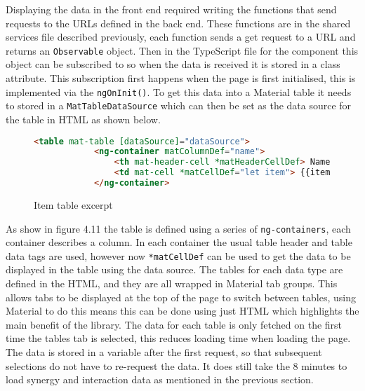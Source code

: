 Displaying the data in the front end required writing the functions that send requests to the URLs defined in the back end. 
These functions are in the shared services file described previously, each function sends a get request to a URL and returns an \verb|Observable| 
object. Then in the TypeScript file for the component this object can be subscribed to so when the data is received it is stored in a class attribute. 
This subscription first happens when the page is first initialised, this is implemented via the \verb|ngOnInit()|. To get this data into a Material table it needs to 
stored in a \verb|MatTableDataSource| which can then be set as the data source for the table in HTML as shown below. 
\begin{figure}[!htbp]
    \begin{lstlisting}[language=HTML]
        <table mat-table [dataSource]="dataSource">
            <ng-container matColumnDef="name">
                <th mat-header-cell *matHeaderCellDef> Name </th>
                <td mat-cell *matCellDef="let item"> {{item.name}} </td>
            </ng-container>
    \end{lstlisting}
    \caption{Item table excerpt}
\end{figure}
As show in figure 4.11 the table is defined using a series of \verb|ng-containers|, each container describes a column.
In each container the usual table header and table data tags are used, however now \verb|*matCellDef| can be used to get the data to be 
displayed in the table using the data source. The tables for each data type are defined in the HTML, and they are all wrapped in Material 
tab groups. This allows tabs to be displayed at the top of the page to switch between tables, using Material to do this means this can be done 
using just HTML which highlights the main benefit of the library. The data for each table is only fetched on the first time the tables tab is selected, 
this reduces loading time when loading the page. The data is stored in a variable after the first request, so that subsequent selections do not have to 
re-request the data. It does still take the 8 minutes to load synergy and interaction data as mentioned in the previous section.

